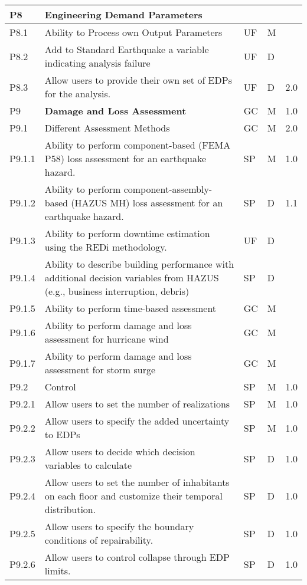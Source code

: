 \begin{longtable}{| p{} | p{} | p{} | p{} |  p{} |}
    
   P8 & \textbf{Engineering Demand Parameters} &  &  & \\ \hline
    P8.1 & Ability to Process own Output Parameters & UF & M &   \\ \hline
    P8.2 & Add to Standard Earthquake a variable indicating analysis failure & UF & D &   \\ \hline
    P8.3 & Allow users to provide their own set of EDPs for the analysis. & UF & D & 2.0\\ \hline

P9 & \textbf{Damage and Loss Assessment} & GC & M & 1.0 \\ \hline
P9.1 & Different Assessment Methods & GC & M & 2.0 \\ \hline
P9.1.1 & Ability to perform component-based (FEMA P58) loss assessment for an earthquake hazard. & SP & M & 1.0 \\ \hline
P9.1.2 & Ability to perform component-assembly-based (HAZUS MH) loss assessment for an earthquake hazard. & SP & D & 1.1 \\ \hline
P9.1.3 & Ability to perform downtime estimation using the REDi methodology. & UF & D & \\ \hline
P9.1.4 & Ability to describe building performance with additional decision variables from HAZUS (e.g., business interruption, debris) & SP & D &  \\ \hline
P9.1.5 &  Ability to perform time-based assessment & GC & M &  \\ \hline
P9.1.6 & Ability to perform damage and loss assessment for hurricane wind & GC & M &  \\ \hline
P9.1.7 & Ability to perform damage and loss assessment for storm surge & GC & M &  \\ \hline
P9.2 & Control & SP & M & 1.0 \\ \hline
P9.2.1 & Allow users to set the number of realizations & SP & M & 1.0\\ \hline
P9.2.2 &  Allow users to specify the added uncertainty to EDPs & SP & M & 1.0 \\ \hline
P9.2.3 &  Allow users to decide which decision variables to calculate & SP & D & 1.0 \\ \hline
P9.2.4 &  Allow users to set the number of inhabitants on each floor and customize their temporal distribution. & SP & D & 1.0 \\ \hline
P9.2.5 &  Allow users to specify the boundary conditions of repairability. & SP & D & 1.0 \\ \hline
P9.2.6 &  Allow users to control collapse through EDP limits. & SP & D & 1.0\\ \hline

\end{longtable}
